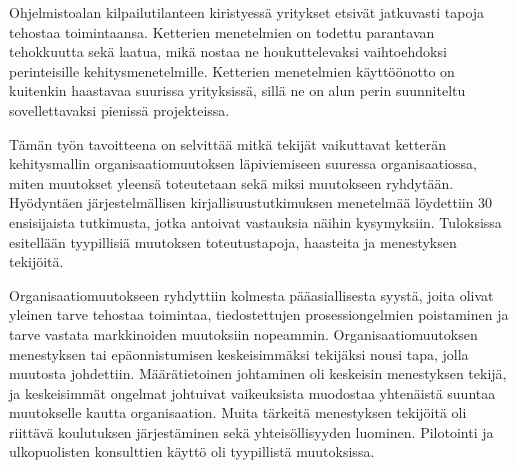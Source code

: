 %
%

\begin{fiabstract}

Ohjelmistoalan kilpailutilanteen kiristyessä yritykset etsivät jatkuvasti tapoja
tehostaa toimintaansa. Ketterien menetelmien on todettu parantavan tehokkuutta
sekä laatua, mikä nostaa ne houkuttelevaksi vaihtoehdoksi perinteisille
kehitysmenetelmille. Ketterien menetelmien käyttöönotto on kuitenkin haastavaa
suurissa yrityksissä, sillä ne on alun perin suunniteltu sovellettavaksi
pienissä projekteissa.

Tämän työn tavoitteena on selvittää mitkä tekijät vaikuttavat ketterän
kehitysmallin organisaatiomuutoksen läpiviemiseen suuressa organisaatiossa,
miten muutokset yleensä toteutetaan sekä miksi muutokseen ryhdytään. Hyödyntäen
järjestelmällisen kirjallisuustutkimuksen menetelmää löydettiin 30 ensisijaista
tutkimusta, jotka antoivat vastauksia näihin kysymyksiin. Tuloksissa esitellään
tyypillisiä muutoksen toteutustapoja, haasteita ja menestyksen tekijöitä.

Organisaatiomuutokseen ryhdyttiin kolmesta pääasiallisesta syystä, joita olivat
yleinen tarve tehostaa toimintaa, tiedostettujen prosessiongelmien poistaminen
ja tarve vastata markkinoiden muutoksiin nopeammin. Organisaatiomuutoksen
menestyksen tai epäonnistumisen keskeisimmäksi tekijäksi nousi tapa, jolla
muutosta johdettiin. Määrätietoinen johtaminen oli keskeisin menestyksen tekijä,
ja keskeisimmät ongelmat johtuivat vaikeuksista muodostaa yhtenäistä suuntaa
muutokselle kautta organisaation. Muita tärkeitä menestyksen tekijöitä oli
riittävä koulutuksen järjestäminen sekä yhteisöllisyyden luominen.
Pilotointi ja ulkopuolisten konsulttien käyttö oli tyypillistä muutoksissa.



%
\end{fiabstract}


